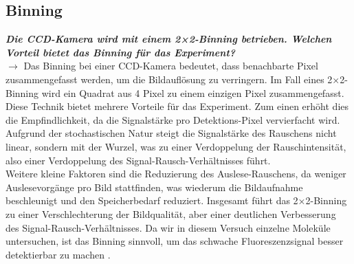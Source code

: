 \subsection{\label{subsec:FZV10}Binning}
\textbf{\textit{Die CCD-Kamera wird mit einem 2×2-Binning betrieben. Welchen Vorteil bietet das Binning für das Experiment?}} \\
$\rightarrow$
Das Binning bei einer CCD-Kamera bedeutet, dass benachbarte Pixel zusammengefasst werden, 
um die Bildauflösung zu verringern. Im Fall eines 2×2-Binning wird ein Quadrat aus 4 Pixel 
zu einem einzigen Pixel zusammengefasst. Diese Technik bietet mehrere Vorteile für das Experiment. 
Zum einen erhöht dies die Empfindlichkeit, da die Signalstärke pro Detektions-Pixel vervierfacht 
wird. Aufgrund der stochastischen Natur steigt die Signalstärke des Rauschens nicht linear, 
sondern mit der Wurzel, was zu einer Verdoppelung der Rauschintensität, also einer Verdoppelung 
des Signal-Rausch-Verhältnisses führt. \\
Weitere kleine Faktoren sind die Reduzierung des Auslese-Rauschens, da weniger Auslesevorgänge 
pro Bild stattfinden, was wiederum die Bildaufnahme beschleunigt und den Speicherbedarf reduziert. 
Insgesamt führt das 2×2-Binning zu einer Verschlechterung der Bildqualität, aber einer deutlichen
Verbesserung des Signal-Rausch-Verhältnisses. Da wir in diesem Versuch einzelne Moleküle untersuchen, 
ist das Binning sinnvoll, um das schwache Fluoreszenzsignal besser detektierbar zu machen \cite{MMS}. \\

